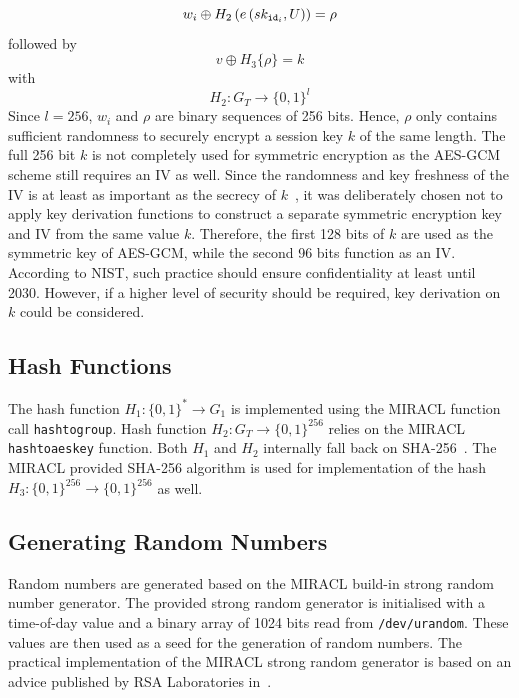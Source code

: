 \begin{equation*}
 w_i \oplus H_2 \left( e \left( sk_{\mathtt{id}_{i}}, U \right) \right) = \rho
\end{equation*}
followed by
\begin{equation*}
 v \oplus H_3 \{ \rho \} = k
\end{equation*}
with
\begin{equation*}
 H_2: G_T \rightarrow \{ 0,1 \}^{l}
\end{equation*}
Since $l=256$, $w_i$ and $\rho$ are binary sequences of 256 bits. Hence, $\rho$ only contains sufficient randomness to securely encrypt a session key $k$ of the same length. The full 256 bit $k$ is not completely used for symmetric encryption as the AES-GCM scheme still requires an IV as well. Since the randomness and key freshness of the IV is at least as important as the secrecy of $k$~\cite{nist:dworkin}, it was deliberately chosen not to apply key derivation functions to construct a separate symmetric encryption key and IV from the same value $k$. Therefore, the first 128 bits of $k$ are used as the symmetric key of AES-GCM, while the second 96 bits function as an IV. According to NIST, such practice should ensure confidentiality at least until 2030. However, if a higher level of security should be required, key derivation on $k$ could be considered.

\subsection{Hash Functions}
The hash function $H_1: \{ 0,1 \}^{*} \rightarrow G_1$ is implemented using the MIRACL function call \texttt{hash\textunderscore to\textunderscore group}. Hash function $H_2: G_T \rightarrow \{ 0,1 \}^{256}$ relies on the {MIRACL} \texttt{hash\textunderscore to\textunderscore aes\textunderscore key} function. Both $H_1$ and $H_2$ internally fall back on SHA-256~\cite{nist:fips1804}. The MIRACL provided SHA-256 algorithm is used for implementation of the hash $H_3: \{ 0, 1 \}^{256} \rightarrow \{ 0,1 \}^{256}$ as well.

\subsection{Generating Random Numbers}
Random numbers are generated based on the MIRACL build-in strong random number generator. The provided strong random generator is initialised with a time-of-day value and a binary array of 1024 bits read from \texttt{/dev/urandom}. These values are then used as a seed for the generation of random numbers. The practical implementation of the MIRACL strong random generator is based on an advice published by RSA Laboratories in~\cite{art:Matthews96}.

